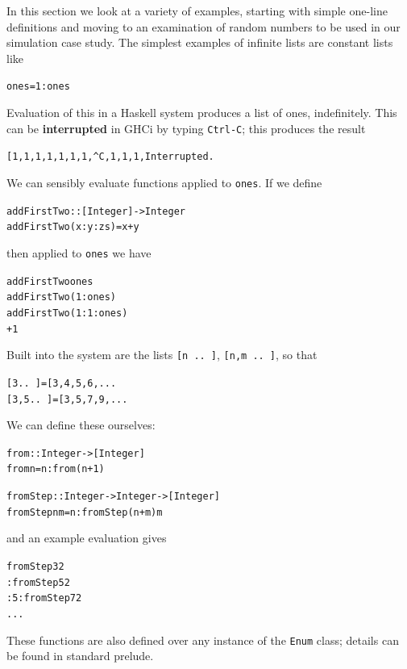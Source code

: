 In this section we look at a variety of examples, starting with simple
one-line definitions and moving to an examination
of random numbers to be used in our
simulation case study.
The simplest examples of infinite lists are constant lists like
\begin{alltt}
ones = 1 : ones
\end{alltt}
Evaluation of this in a Haskell system
produces a list of ones, indefinitely. This
can be \textbf{interrupted} in GHCi
by typing \texttt{Ctrl-C}; this produces the result
\begin{alltt}
[1,1,1,1,1,1,1,\^{}C,1,1,1,Interrupted.
\end{alltt}
We can sensibly evaluate functions applied to \texttt{ones}. If we define
\begin{alltt}
addFirstTwo :: [Integer] -> Integer
addFirstTwo (x:y:zs) = x+y
\end{alltt}
then applied to \texttt{ones} we have
\begin{alltt}
addFirstTwo ones
\step addFirstTwo (1:ones) 
\step addFirstTwo (1:1:ones)
+1
\end{alltt} 
Built into the system are the lists \texttt{[n ..\ ]}, \texttt{[n,m ..\ ]}, so that
\begin{alltt}
[3 ..\ ]   = [3,4,5,6,...
[3,5 ..\ ] = [3,5,7,9,...
\end{alltt}
We can define these ourselves:
\begin{alltt}
from :: Integer -> [Integer]
from n = n : from (n+1)

fromStep :: Integer -> Integer -> [Integer]
fromStep n m = n : fromStep (n+m) m
\end{alltt}
and an example evaluation gives
\begin{alltt}
fromStep 3 2
 : fromStep 5 2
 : 5 : fromStep 7 2
\step ...
\end{alltt}
These functions are also defined over any instance of the
\texttt{Enum} class;
details can be found in standard prelude.

